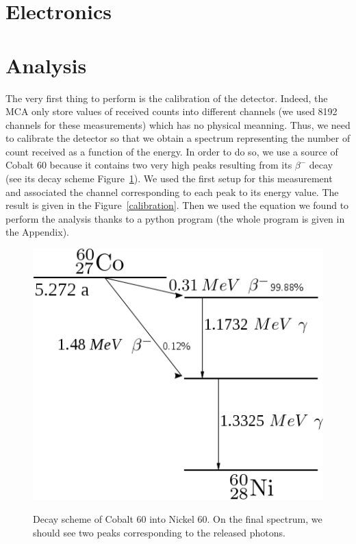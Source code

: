 \documentclass[11pt,a4paper]{article}
\begin{document}
\section{Electronics}


\section{Analysis}

The very first thing to perform is the calibration of the detector. Indeed, the MCA only store values of received counts into different channels (we used 8192 channels for these measurements) which has no physical meanning. Thus, we need to calibrate the detector so that we obtain a spectrum representing the number of count received as a function of the energy. In order to do so, we use a source of Cobalt 60 because it contains two very high peaks resulting from its $\beta^-$ decay (see its decay scheme Figure~\ref{co60}). We used the first setup for this measurement and associated the channel corresponding to each peak to its energy value. The result is given in the Figure~\ref{calibration}. Then we used the equation we found to perform the analysis thanks to a python program (the whole program is given in the Appendix).

\begin{figure}[!h]
\centering
\includegraphics[scale=0.4]{Co60_decay.png}
\label{co60}
\caption{Decay scheme of Cobalt 60 into Nickel 60. On the final spectrum, we should see two peaks corresponding to the released photons.}
\end{figure}
\end{document}
